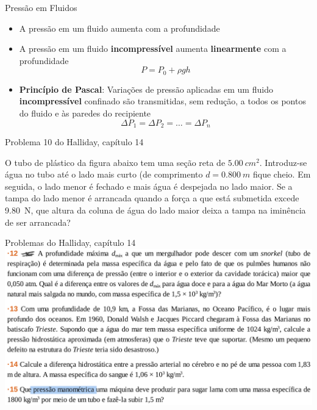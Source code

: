 \documentclass[t,%
brazilian,%
11pt,%
aspectratio=169,%
table%
]{beamer}
\begin{document}
\begin{frame}{Pressão em Fluidos}
    \begin{itemize}
        \item A pressão em um fluido aumenta com a profundidade
        \item A pressão em um fluido \textbf{incompressível} aumenta \textbf{linearmente} com a profundidade
            \[
                P=P_0 + \rho g h
            \]
        \item \textbf{Princípio de Pascal}: Variações de pressão aplicadas em
            um fluido \textbf{incompressível} confinado são transmitidas, sem
            redução, a todos os pontos do fluido e às paredes do recipiente
            \[
                \Delta P_1 = \Delta P_2 = \ldots = \Delta P_n
            \]
    \end{itemize}
\end{frame}

\begin{frame}{Problema 10 do Halliday, capítulo 14}
    \begin{minipage}{\textwidth}
        O tubo de plástico da figura abaixo tem uma seção reta de \(\SI{5,00}{cm^2}\).
        Introduz-se água no tubo até o lado mais curto (de comprimento \(d= \SI{0,800}{m}\) fique
        cheio. Em seguida, o lado menor é fechado e mais água é despejada no lado maior. Se a tampa do lado menor
        é arrancada quando a força a que está submetida excede \SI{9,80}{N}, que altura da coluna de água do lado
        maior deixa a tampa na iminência de ser arrancada?
    \end{minipage}

    \vspace{1cm}\centering
\end{frame}

\begin{frame}{Problemas do Halliday, capítulo 14}
    \includegraphics[height=\textheight-28pt]{images/Captura de tela de 2024-01-11 14-57-52.png}
\end{frame}
\end{document}
